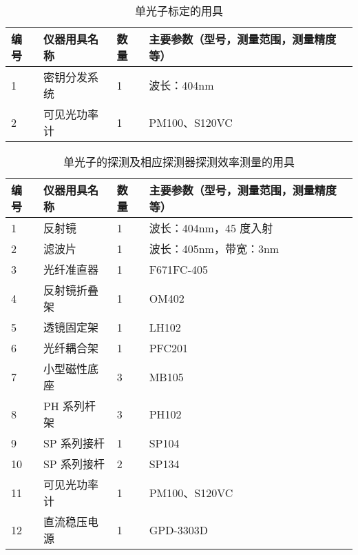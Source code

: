 \documentclass[dvipsnames, svgnames,a4paper,11pt]{article}
\begin{document}
\begin{table}[htbp]
	\centering
	\renewcommand\arraystretch{1.6}
	\caption{单光子标定的用具}
	\begin{tabular}{p{}|p{}|p{}|p{}}
		\hline
		编号& 仪器用具名称 & 数量 &  主要参数（型号，测量范围，测量精度等） \\
		\hline
		1	&	密钥分发系统 	& 1 & 波长：404nm	\\

		2	&	可见光功率计 	& 1 & PM100、S120VC	 \\
		\hline
	\end{tabular}
\end{table}

\begin{table}[htbp]
	\centering
	\renewcommand\arraystretch{1.6}
	\caption{单光子的探测及相应探测器探测效率测量的用具}
	\begin{tabular}{p{}|p{}|p{}|p{}}
		\hline
		编号& 仪器用具名称 & 数量 &  主要参数（型号，测量范围，测量精度等） \\
		\hline
		1	&	反射镜 	& 1 & 波长：404nm，45 度入射	\\

		2	&	滤波片 	& 1 & 波长：405nm，带宽：3nm	 \\
		
		3	&	光纤准直器 & 1 &	F671FC-405 	\\
		
		4	&	反射镜折叠架	& 1 & OM402	\\
		
		5	&	透镜固定架	& 1 & LH102	\\

		6	&	光纤耦合架	& 1 & PFC201 \\

		7	&	小型磁性底座	& 3 & MB105	\\

		8	&	PH 系列杆架	& 3 & PH102	\\

		9	&	SP 系列接杆	& 1 & SP104	\\

		10	&	SP 系列接杆	& 2	& SP134	\\

		11	&	可见光功率计	& 1 & PM100、S120VC	\\

		12	&	直流稳压电源& 1 & GPD-3303D	\\
		\hline
	\end{tabular}
\end{table}
\end{document}
